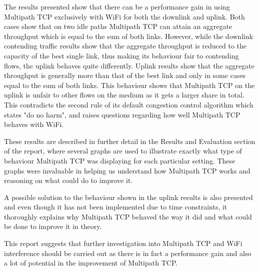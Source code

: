 \documentclass[12pt,a4paper]{article}
\begin{document}
The results presented show that there can be a performance gain in using
Multipath TCP exclusively with WiFi for both the downlink and uplink. Both cases
show that on two idle paths Multipath TCP can attain an aggregate throughput
which is equal to the sum of both links. However, while the downlink contending
traffic results show that the aggregate throughput is reduced to the capacity of
the best single link, thus making its behaviour fair to contending flows, the
uplink behaves quite differently.  Uplink results show that the aggregate
throughput is generally more than that of the best link and only in some cases
equal to the sum of both links. This behaviour shows that Multipath TCP on the
uplink is unfair to other flows on the medium as it gets a larger share in
total. This contradicts the second rule of its default congestion control
algorithm which states "do no harm", and raises questions regarding how well
Multipath TCP behaves with WiFi.

These results are described in further detail in the Results and Evaluation
section of the report, where several graphs are used to illustrate exactly what
type of behaviour Multipath TCP was displaying for each particular setting.
These graphs were invaluable in helping us understand how Multipath TCP works
and reasoning on what could do to improve it.

A possible solution to the behaviour shown in the uplink results is also
presented and even though it has not been implemented due to time constraints,
it thoroughly explains why Multipath TCP behaved the way it did and what could
be done to improve it in theory.

This report suggests that further investigation into Multipath TCP and WiFi
interference should be carried out as there is in fact a performance gain and
also a lot of potential in the improvement of Multipath TCP.
\end{document}
